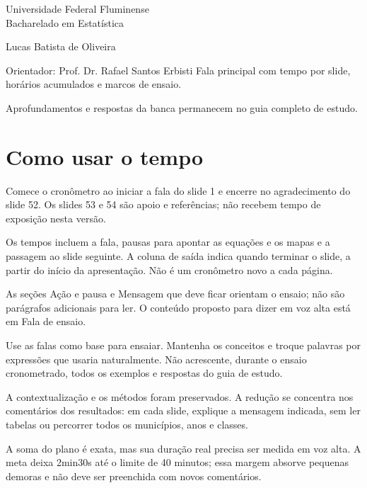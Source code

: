 \documentclass[11pt,a4paper]{article}
\begin{document}
\begin{titlepage}
{\large Universidade Federal Fluminense\\Bacharelado em Estatística\par}
\vspace{0.5cm}{\LARGE Meta de ensaio: 37min30s\par}
\vspace{1cm}{\Large Distribuição espacial da dengue no Brasil: identificação de áreas de alto risco e características socioambientais\par}
\vspace{1cm}Lucas Batista de Oliveira\par Orientador: Prof. Dr. Rafael Santos Erbisti
\vfill
Fala principal com tempo por slide, horários acumulados e marcos de ensaio.\par
Aprofundamentos e respostas da banca permanecem no guia completo de estudo.
\end{titlepage}
\section*{Como usar o tempo}
Comece o cronômetro ao iniciar a fala do slide 1 e encerre no agradecimento do slide 52. Os slides 53 e 54 são apoio e referências; não recebem tempo de exposição nesta versão.

Os tempos incluem a fala, pausas para apontar as equações e os mapas e a passagem ao slide seguinte. A coluna de saída indica quando terminar o slide, a partir do início da apresentação. Não é um cronômetro novo a cada página.

As seções Ação e pausa e Mensagem que deve ficar orientam o ensaio; não são parágrafos adicionais para ler. O conteúdo proposto para dizer em voz alta está em Fala de ensaio.

Use as falas como base para ensaiar. Mantenha os conceitos e troque palavras por expressões que usaria naturalmente. Não acrescente, durante o ensaio cronometrado, todos os exemplos e respostas do guia de estudo.

A contextualização e os métodos foram preservados. A redução se concentra nos comentários dos resultados: em cada slide, explique a mensagem indicada, sem ler tabelas ou percorrer todos os municípios, anos e classes.

A soma do plano é exata, mas sua duração real precisa ser medida em voz alta. A meta deixa 2min30s até o limite de 40 minutos; essa margem absorve pequenas demoras e não deve ser preenchida com novos comentários.
\end{document}
